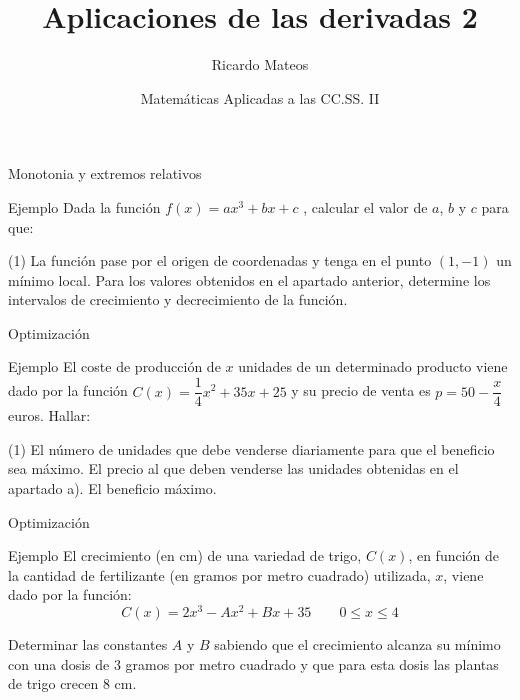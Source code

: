 \documentclass[8pt]{beamer}
\title{Aplicaciones de las derivadas 2}
\author{Ricardo Mateos}
\institute[UHEI-IVED]{Departamento de Matemáticas \\ UHEI - IVED}
\date{Matemáticas Aplicadas a las CC.SS. II}
\begin{document}
\begin{frame}
\maketitle
\end{frame}

\begin{frame}
\tableofcontents
\end{frame}



\begin{frame}[t]{Monotonia y extremos relativos}
\begin{exampleblock}{Ejemplo}
Dada la función $f(x)=ax^3+bx+c$ , calcular el valor de $a$, $b$ y $c$ para
que:
\begin{tasks}[label=\alph*)](1)
\task La función pase por el origen de coordenadas y tenga en el punto $(1,-1)$ un mínimo local.
\task Para los valores obtenidos en el apartado anterior, determine los intervalos de crecimiento y decrecimiento de la función.
\end{tasks}
\end{exampleblock}
\end{frame}

\begin{frame}[t]{Optimización}
\begin{exampleblock}{Ejemplo}
El coste de producción de $x$ unidades de un determinado producto viene dado por la función $C(x)=\dfrac{1}{4}x^2+35x+25$ y su precio de venta es $p=50-\dfrac{x}{4}$
 euros. Hallar:

\begin{tasks}[label=\alph*)](1)
\task El número de unidades que debe venderse diariamente para que el beneficio sea máximo.
\task El precio al que deben venderse las unidades obtenidas en el apartado a).
\task El beneficio máximo.
\end{tasks}

\end{exampleblock}
\end{frame}



\begin{frame}[t]{Optimización}
\begin{exampleblock}{Ejemplo}
El crecimiento (en cm) de una variedad de trigo, $C(x)$, en función de la cantidad de fertilizante (en gramos por metro cuadrado) utilizada, $x$, viene dado por la función:
\[ C(x)=2x^3-Ax^2+Bx+35 \qquad 0 \leq x \leq 4 \] 

Determinar las constantes $A$ y $B$ sabiendo que el crecimiento alcanza su mínimo con una dosis de 3 gramos por metro cuadrado y que para esta dosis las plantas de trigo crecen 8 cm.
\end{exampleblock}
\end{frame}
\end{document}
